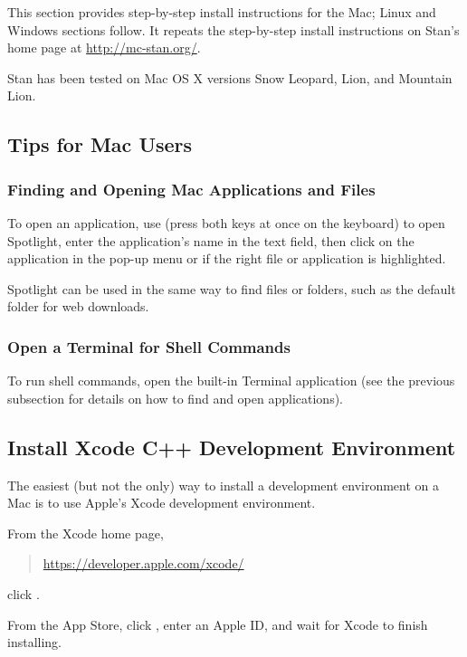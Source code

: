 This section provides step-by-step install instructions for the Mac;
Linux and Windows sections follow.  It repeats the step-by-step
install instructions on Stan's home page at \url{http://mc-stan.org/}.

Stan has been tested on Mac OS X versions Snow Leopard, Lion, and
Mountain Lion.

\subsection{Tips for Mac Users}

\subsubsection{Finding and Opening Mac Applications and Files}

To open an application, use  (press both keys at
once on the keyboard) to open Spotlight, enter the application's name
in the text field, then click on the application in the pop-up menu or
\code{[Return]} if the right file or application is highlighted.

Spotlight can be used in the same way to find files or folders,
such as the default  folder for web downloads.

\subsubsection{Open a Terminal for Shell Commands}

To run shell commands, open the built-in Terminal application (see the
previous subsection for details on how to find and open applications).

\subsection{Install Xcode C++ Development Environment}

The easiest (but not the only) way to install a \Cpp
development environment on a Mac is to use Apple's Xcode
development environment.

From the Xcode home page, 
%
\begin{quote}
\url{https://developer.apple.com/xcode/}
\end{quote}
%
click .

From the App Store, click , enter an Apple ID,
and wait for Xcode to finish installing.

